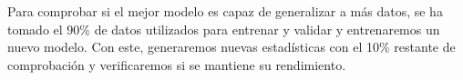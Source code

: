 \documentclass[10pt,a4paper,twoside]{article}
\begin{document}
\begin{multicols*}{2}
    \begin{table}[H]
        \begin{center}
        \end{center}
        \caption{Rendimiento de modelos sobre los datos de entrenamiento y selección}
        \label{table:rendimientomodelos}
    \end{table}

    Para comprobar si el mejor modelo es capaz de generalizar a más datos, se ha tomado el 90\% de datos utilizados para entrenar y validar y entrenaremos un nuevo modelo. Con este, generaremos nuevas estadísticas con el 10\% restante de comprobación y verificaremos si se mantiene su rendimiento.


\end{multicols*}
\end{document}
